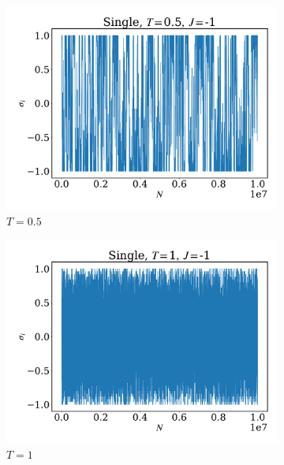 \documentclass[12pt]{article}
\begin{document}
\begin{figure}
\begin{subfigure}[b]{0.49\textwidth}
		\includegraphics[width=\textwidth]{fig1DJ1N1e7/sig_s_T0.5J-1.pdf}
		\caption{$T=0.5$}
	\end{subfigure}
	\begin{subfigure}[b]{0.49\textwidth}
		\centering
		\includegraphics[width=\textwidth]{fig1DJ1N1e7/sig_s_T1J-1.pdf}
		\caption{$T=1$}
	\end{subfigure}
	\begin{subfigure}[b]{0.49\textwidth}
		\centering

\end{subfigure}
\end{figure}
\end{document}
